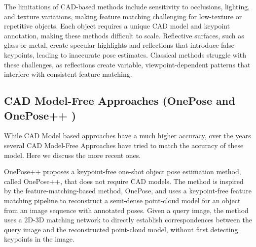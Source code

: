 \documentclass[conference]{IEEEtran}
\begin{document}
The limitations of CAD-based methods include sensitivity to occlusions, lighting, and texture variations, making feature matching challenging for low-texture or repetitive objects. Each object requires a unique CAD model and keypoint annotation, making these methods difficult to scale. Reflective surfaces, such as glass or metal, create specular highlights and reflections that introduce false keypoints, leading to inaccurate pose estimates. Classical methods struggle with these challenges, as reflections create variable, viewpoint-dependent patterns that interfere with consistent feature matching.

\subsection{CAD Model-Free Approaches (OnePose\cite{sun2022onepose} and OnePose++ \cite{he2022oneposeplusplus})}
While CAD Model based approaches have a much higher accuracy, over the years several CAD Model-Free Approaches have tried to match the accuracy of these model. Here we discuss the more recent ones.

OnePose++ proposes a keypoint-free one-shot object pose estimation method, called OnePose++, that does not require CAD models. The method is inspired by the feature-matching-based method, OnePose, and uses a keypoint-free feature matching pipeline to reconstruct a semi-dense point-cloud model for an object from an image sequence with annotated poses. Given a query image, the method uses a 2D-3D matching network to directly establish correspondences between the query image and the reconstructed point-cloud model, without first detecting keypoints in the image.
\end{document}
